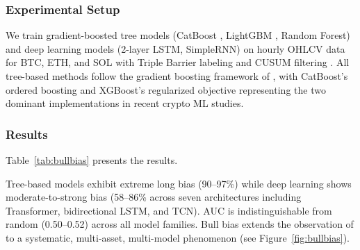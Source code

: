 \documentclass[preprint,12pt,authoryear]{elsarticle}
\begin{document}
\subsubsection{Experimental Setup}
We train gradient-boosted tree models (CatBoost \citep{prokhorenkova2018catboost}, LightGBM \citep{ke2017lightgbm}, Random Forest) and deep learning models (2-layer LSTM, SimpleRNN) on hourly OHLCV data for BTC, ETH, and SOL with Triple Barrier labeling and CUSUM filtering \citep{lopezdeprado2018advances}. All tree-based methods follow the gradient boosting framework of \citet{friedman2001greedy}, with CatBoost's ordered boosting \citep{dorogush2018catboost} and XGBoost's regularized objective \citep{chen2016xgboost} representing the two dominant implementations in recent crypto ML studies.

\subsubsection{Results}
Table~\ref{tab:bullbias} presents the results.

\begin{table}[htbp]
\centering
\caption{Bull bias across assets and model families.}
\label{tab:bullbias}
\end{table}

Tree-based models exhibit extreme long bias (90--97\%) while deep learning shows moderate-to-strong bias (58--86\% across seven architectures including Transformer, bidirectional LSTM, and TCN). AUC is indistinguishable from random (0.50--0.52) across all model families. Bull bias extends the observation of \citet{jaquart2021short} to a systematic, multi-asset, multi-model phenomenon (see Figure~\ref{fig:bullbias}).
\end{document}
